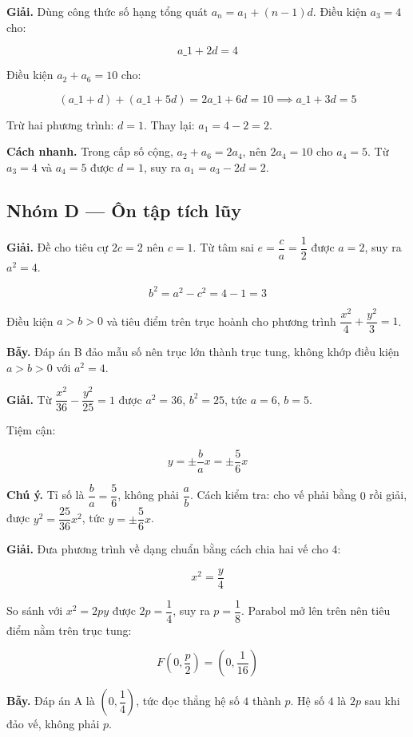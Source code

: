 \documentclass[11pt, a4paper]{article}
\begin{document}
\begin{dapan}[25 — Đáp án B]
\textbf{Giải.} Dùng công thức số hạng tổng quát $a_n = a_1 + (n-1)d$. Điều kiện $a_3 = 4$ cho:

$$a\_1 + 2d = 4$$

Điều kiện $a_2 + a_6 = 10$ cho:

$$(a\_1 + d) + (a\_1 + 5d) = 2a\_1 + 6d = 10 \implies a\_1 + 3d = 5$$

Trừ hai phương trình: $d = 1$. Thay lại: $a_1 = 4 - 2 = 2$.

\textbf{Cách nhanh.} Trong cấp số cộng, $a_2 + a_6 = 2a_4$, nên $2a_4 = 10$ cho $a_4 = 5$. Từ $a_3 = 4$ và $a_4 = 5$ được $d = 1$, suy ra $a_1 = a_3 - 2d = 2$.
\end{dapan}

\subsection*{Nhóm D — Ôn tập tích lũy}

\begin{dapan}[1 — Đáp án A]
\textbf{Giải.} Đề cho tiêu cự $2c = 2$ nên $c = 1$. Từ tâm sai $e = \dfrac{c}{a} = \dfrac{1}{2}$ được $a = 2$, suy ra $a^2 = 4$.

$$b^2 = a^2 - c^2 = 4 - 1 = 3$$

Điều kiện $a > b > 0$ và tiêu điểm trên trục hoành cho phương trình $\dfrac{x^2}{4} + \dfrac{y^2}{3} = 1$.

\textbf{Bẫy.} Đáp án B đảo mẫu số nên trục lớn thành trục tung, không khớp điều kiện $a > b > 0$ với $a^2 = 4$.
\end{dapan}

\begin{dapan}[2 — Đáp án B]
\textbf{Giải.} Từ $\dfrac{x^2}{36} - \dfrac{y^2}{25} = 1$ được $a^2 = 36$, $b^2 = 25$, tức $a = 6$, $b = 5$.

Tiệm cận:

$$y = \pm\frac{b}{a}x = \pm\frac{5}{6}x$$

\textbf{Chú ý.} Tỉ số là $\dfrac{b}{a} = \dfrac{5}{6}$, không phải $\dfrac{a}{b}$. Cách kiểm tra: cho vế phải bằng $0$ rồi giải, được $y^2 = \dfrac{25}{36}x^2$, tức $y = \pm\dfrac{5}{6}x$.
\end{dapan}

\begin{dapan}[3 — Đáp án C]
\textbf{Giải.} Đưa phương trình về dạng chuẩn bằng cách chia hai vế cho $4$:

$$x^2 = \frac{y}{4}$$

So sánh với $x^2 = 2py$ được $2p = \dfrac{1}{4}$, suy ra $p = \dfrac{1}{8}$. Parabol mở lên trên nên tiêu điểm nằm trên trục tung:

$$F\left(0, \frac{p}{2}\right) = \left(0, \frac{1}{16}\right)$$

\textbf{Bẫy.} Đáp án A là $\left(0, \dfrac{1}{4}\right)$, tức đọc thẳng hệ số $4$ thành $p$. Hệ số $4$ là $2p$ sau khi đảo vế, không phải $p$.
\end{dapan}
\end{document}
